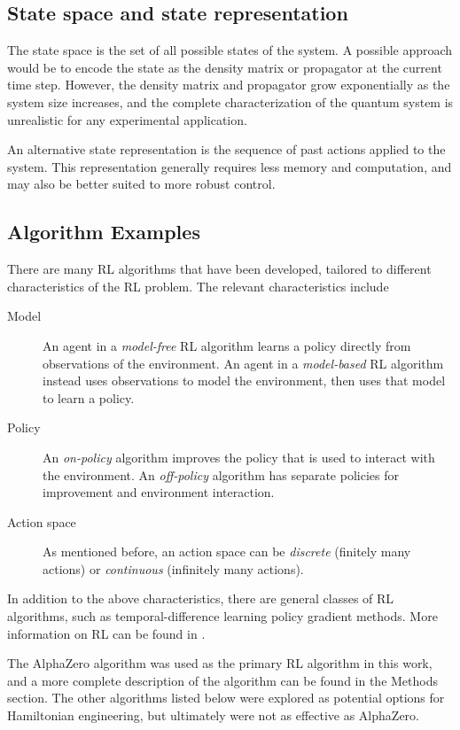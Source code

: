 \subsection{State space and state representation}

The state space is the set of all possible states of the system. A possible approach would be to encode the state as the density matrix or propagator at the current time step. However, the density matrix and propagator grow exponentially as the system size increases, and the complete characterization of the quantum system is unrealistic for any experimental application.

An alternative state representation is the sequence of past actions applied to the system.  This representation generally requires less memory and computation, and may also be better suited to more robust control.

\subsection{Algorithm Examples}

There are many RL algorithms that have been developed, tailored to different characteristics of the RL problem. The relevant characteristics include
\begin{description}
    \item[Model] An agent in a \emph{model-free} RL algorithm learns a policy directly from observations of the environment. An agent in a \emph{model-based} RL algorithm instead uses observations to model the environment, then uses that model to learn a policy.
    \item[Policy] An \emph{on-policy} algorithm improves the policy that is used to interact with the environment. An \emph{off-policy} algorithm has separate policies for improvement and environment interaction.
    \item[Action space] As mentioned before, an action space can be \emph{discrete} (finitely many actions) or \emph{continuous} (infinitely many actions).
\end{description}
In addition to the above characteristics, there are general classes of RL algorithms, such as temporal-difference learning policy gradient methods. More information on RL can be found in \cite{sutton2018reinforcement}.


The AlphaZero algorithm was used as the primary RL algorithm in this work, and a more complete description of the algorithm can be found in the Methods section. The other algorithms listed below were explored as potential options for Hamiltonian engineering, but ultimately were not as effective as AlphaZero.

